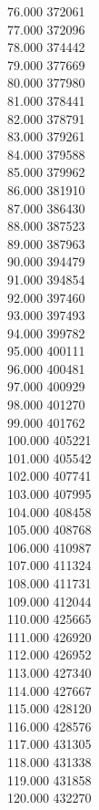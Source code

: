 { 76.000	372061 \\
 77.000	372096 \\
 78.000	374442 \\
 79.000	377669 \\
 80.000	377980 \\
 81.000	378441 \\
 82.000	378791 \\
 83.000	379261 \\
 84.000	379588 \\
 85.000	379962 \\
 86.000	381910 \\
 87.000	386430 \\
 88.000	387523 \\
 89.000	387963 \\
 90.000	394479 \\
 91.000	394854 \\
 92.000	397460 \\
 93.000	397493 \\
 94.000	399782 \\
 95.000	400111 \\
 96.000	400481 \\
 97.000	400929 \\
 98.000	401270 \\
 99.000	401762 \\
 100.000	405221 \\
 101.000	405542 \\
 102.000	407741 \\
 103.000	407995 \\
 104.000	408458 \\
 105.000	408768 \\
 106.000	410987 \\
 107.000	411324 \\
 108.000	411731 \\
 109.000	412044 \\
 110.000	425665 \\
 111.000	426920 \\
 112.000	426952 \\
 113.000	427340 \\
 114.000	427667 \\
 115.000	428120 \\
 116.000	428576 \\
 117.000	431305 \\
 118.000	431338 \\
 119.000	431858 \\
 120.000	432270 \\
}

